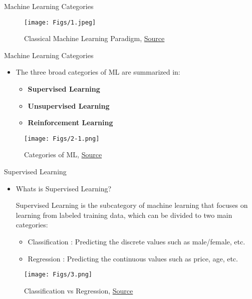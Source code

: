 \documentclass[compress,oilve]{beamer}
\newcommand{\tc}[2]{
	\textcolor{#1}{\hspace{-2pt}#2\hspace{-2pt}}
}
\begin{document}
\begin{frame}{Machine Learning Categories}

\begin{figure}
	\centering
	\texttt{[image: Figs/1.jpeg]}
	\caption{Classical Machine Learning Paradigm, \href{https://tinyurl.com/2zldw3my}{Source}}
\end{figure}
\end{frame}


\begin{frame}{Machine Learning Categories}
	\begin{itemize}
	\item The three broad categories of ML are summarized in:
		\begin{itemize}
		\item \textbf{Supervised Learning}
		\item \textbf{Unsupervised Learning}  
		\item \textbf{Reinforcement Learning} 
		\end{itemize}
	\end{itemize}
	\begin{figure}
		\texttt{[image: Figs/2-1.png]}
		\caption{Categories of ML, \href{https://tinyurl.com/2qkt8vza}{Source}}
	\end{figure}
\end{frame}


\begin{frame}{Supervised Learning}
	\begin{itemize}
		\item \tc{keywords}{Whats is Supervised Learning?}\\
		\medskip
		\tc{keywords}{Supervised Learning} is the subcategory of machine learning that focuses on learning from labeled training data, which can be divided to two main categories:
	
	\medskip
	\begin{itemize}
		\item \tc{keywords}{Classification}: Predicting the discrete values such as male/female, etc.
		\item \tc{keywords}{Regression}: Predicting the continuous values such as price, age, etc.
	\end{itemize}

	\end{itemize}

\begin{figure}[htbp!]
	\centering
	{
		\texttt{[image: Figs/3.png]}
	}
	\caption{Classification vs Regression, \href{https://tinyurl.com/2kvrm8jf}{Source}}
	\label{fig:globalfigure5}
\end{figure}


\end{frame}
\end{document}
